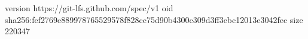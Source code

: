 version https://git-lfs.github.com/spec/v1
oid sha256:fef2769e889978765529578f828cc75d90b4300c309d3ff3ebc12013e3042fec
size 220347
